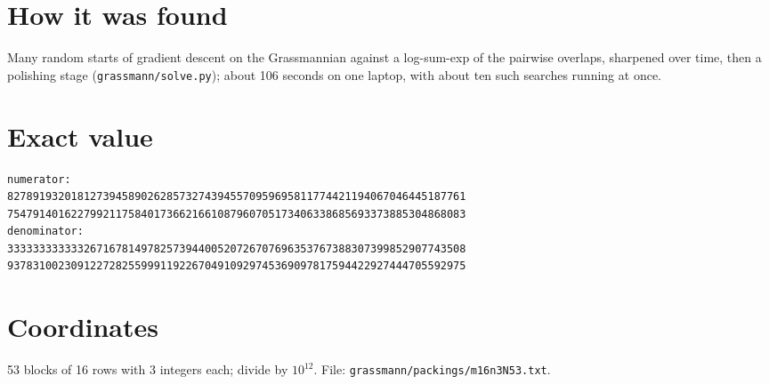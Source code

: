 \documentclass[11pt,a4paper]{article}
\begin{document}
\section{How it was found}
Many random starts of gradient descent on the Grassmannian against a log-sum-exp of the pairwise overlaps, sharpened over time, then a polishing stage (\texttt{grassmann/solve.py}); about 106 seconds on one laptop, with about ten such searches running at once.


\appendix
\section{Exact value}
{\small
\begin{verbatim}
numerator:
827891932018127394589026285732743945570959695811774421194067046445187761
754791401622799211758401736621661087960705173406338685693373885304868083
denominator:
333333333333267167814978257394400520726707696353767388307399852907743508
937831002309122728255999119226704910929745369097817594422927444705592975
\end{verbatim}}

\section{Coordinates}
53 blocks of 16 rows with 3 integers each; divide by $10^{12}$. File: \texttt{grassmann/packings/m16n3N53.txt}.
{\tiny
\begin{multicols}{3}
\end{multicols}}
\end{document}
